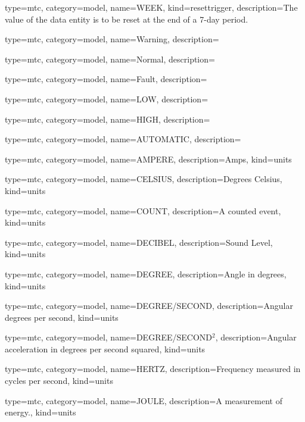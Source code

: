 {
  type=mtc,
  category=model,
  name={WEEK},
  kind={resettrigger},
  description={The value of the \gls{data entity} is to be reset at the end of a 7-day period.}
}


{
  type=mtc,
  category=model,
  name={Warning},
  description={}
}


{
  type=mtc,
  category=model,
  name={Normal},
  description={}
}


{
  type=mtc,
  category=model,
  name={Fault},
  description={}
}


{
  type=mtc,
  category=model,
  name={LOW},
  description={}
}


{
  type=mtc,
  category=model,
  name={HIGH},
  description={}
}


{
  type=mtc,
  category=model,
  name={AUTOMATIC},
  description={}
}


{
  type=mtc,
  category=model,
  name={AMPERE},
  description={Amps},
  kind={units}
}


{
  type=mtc,
  category=model,
  name={CELSIUS},
  description={Degrees Celsius},
  kind={units}
}


{
  type=mtc,
  category=model,
  name={COUNT},
  description={A counted event},
  kind={units}
}


{
  type=mtc,
  category=model,
  name={DECIBEL},
  description={Sound Level},
  kind={units}
}


{
  type=mtc,
  category=model,
  name={DEGREE},
  description={Angle in degrees},
  kind={units}
}


{
  type=mtc,
  category=model,
  name={DEGREE/SECOND},
  description={Angular degrees per second},
  kind={units}
}


{
  type=mtc,
  category=model,
  name={DEGREE/SECOND$^2$},
  description={Angular acceleration in degrees per second squared},
  kind={units}
}


{
  type=mtc,
  category=model,
  name={HERTZ},
  description={Frequency measured in cycles per second},
  kind={units}
}


{
  type=mtc,
  category=model,
  name={JOULE},
  description={A measurement of energy.},
  kind={units}
}


